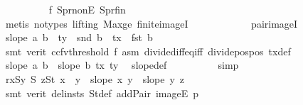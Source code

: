 \begin{isabellebody}
\ \ \ \ \ \ \ \ \isamarkupfalse%
\ f{}\ S{}pr{\isacharunderscore}{\kern0pt}nonE\ S{}pr{\isacharunderscore}{\kern0pt}fin\isanewline
\ \ \ \ \ \ \ \ \isamarkupfalse%
\ {\isacharparenleft}{\kern0pt}metis\ {\isacharparenleft}{\kern0pt}no{\isacharunderscore}{\kern0pt}types{\isacharcomma}{\kern0pt}\ lifting{\isacharparenright}{\kern0pt}\ Max{\isacharunderscore}{\kern0pt}ge\ finite{\isacharunderscore}{\kern0pt}imageI\isanewline
\ \ \ \ \ \ \ \ \ \ \ \ pair{\isacharunderscore}{\kern0pt}imageI{\isacharparenright}{\kern0pt}\isanewline
\ \ \ \ \ \ \isamarkupfalse%
\ {\isachardoublequoteopen}slope\ a\ b\ {\isacharless}{\kern0pt}\ {\isacharparenleft}{\kern0pt}ty\ {\isacharminus}{\kern0pt}\ snd\ b{\isacharparenright}{\kern0pt}\ {\isacharslash}{\kern0pt}\ {\isacharparenleft}{\kern0pt}tx\ {\isacharminus}{\kern0pt}\ fst\ b{\isacharparenright}{\kern0pt}{\isachardoublequoteclose}\isanewline
\ \ \ \ \ \ \ \ \isamarkupfalse%
\ {\isacharparenleft}{\kern0pt}smt\ {\isacharparenleft}{\kern0pt}verit{\isacharcomma}{\kern0pt}\ ccfv{\isacharunderscore}{\kern0pt}threshold{\isacharparenright}{\kern0pt}\ f{}\ asm{\isacharparenleft}{\kern0pt}{}{\isacharparenright}{\kern0pt}\ divide{\isacharunderscore}{\kern0pt}diff{\isacharunderscore}{\kern0pt}eq{\isacharunderscore}{\kern0pt}iff\ divide{\isacharunderscore}{\kern0pt}pos{\isacharunderscore}{\kern0pt}pos\ tx{\isacharunderscore}{\kern0pt}def{\isacharparenright}{\kern0pt}\isanewline
\ \ \ \ \ \ \isamarkupfalse%
\ {\isachardoublequoteopen}slope\ a\ b\ {\isacharless}{\kern0pt}\ slope\ b\ {\isacharparenleft}{\kern0pt}tx{\isacharcomma}{\kern0pt}\ ty{\isacharparenright}{\kern0pt}{\isachardoublequoteclose}\ \isamarkupfalse%
\ slope{\isacharunderscore}{\kern0pt}def\isanewline
\ \ \ \ \ \ \ \ \isamarkupfalse%
\ simp\isanewline
\ \ \ \ \isamarkupfalse%
\isanewline
\ \ \ \ \isamarkupfalse%
\ r{}{\isacharcolon}{\kern0pt}{\isachardoublequoteopen}{\isasymforall}x{\isasymin}S{}{\isachardot}{\kern0pt}{\isasymforall}y{\isasymin}\ S{}{\isachardot}{\kern0pt}\ {\isasymforall}z{\isasymin}S{}t{\isachardot}{\kern0pt}\ x\ {\isacharless}{\kern0pt}\ y\ {\isasymlongrightarrow}\ slope\ x\ y\ {\isacharless}{\kern0pt}\ slope\ y\ z{\isachardoublequoteclose}\isanewline
\ \ \ \ \ \ \isamarkupfalse%
\ {\isacharparenleft}{\kern0pt}smt\ {\isacharparenleft}{\kern0pt}verit{\isacharcomma}{\kern0pt}\ del{\isacharunderscore}{\kern0pt}insts{\isacharparenright}{\kern0pt}\ S{}t{\isacharunderscore}{\kern0pt}def\ add{\isacharunderscore}{\kern0pt}Pair\ imageE\ p{}\isanewline

\end{isabellebody}
